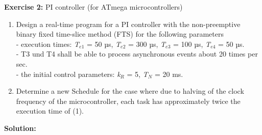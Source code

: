 \textbf{Exercise 2: }PI controller (for ATmega microcontrollers)

\begin{enumerate}
\item Design a real-time program for a PI controller with the non-preemptive binary fixed time-slice method (FTS) for the following parameters \\- execution times: \textit{T}${}_{e1}$ = 50 µs, \textit{T}${}_{e2}$ = 300 µs, \textit{T}${}_{e3}$ = 100 µs, \textit{T}${}_{e4}$ = 50 µs.\\ - T3 und T4 shall be able to process asynchronous events about 20 times per sec.\\- the initial control parameters: \textit{k${}_{R}$} = 5, \textit{T${}_{N}$} = 20 ms.
\item Determine a new Schedule for the case where due to halving of the clock frequency of the microcontroller, each task has approximately twice the execution time of (1).
\end{enumerate}

\textbf{Solution:}

